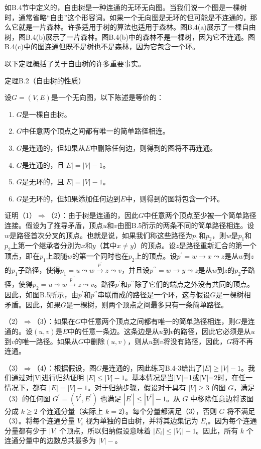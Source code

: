 \documentclass[lang=cn,newtx,10pt,scheme=chinese]{elegantbook}
\begin{document}
如B.4节中定义的，自由树是一种连通的无环无向图。当我们说一个图是一棵树时，通常省略“自由”这个形容词。如果一个无向图是无环的但可能是不连通的，那么它就是一片森林。许多适用于树的算法也适用于森林。图B.4(a)展示了一棵自由树，图B.4(b)展示了一片森林。图B.4(b)中的森林不是一棵树，因为它不连通。图B.4(c)中的图连通但既不是树也不是森林，因为它包含一个环。

以下定理概括了关于自由树的许多重要事实。

定理B.2（自由树的性质）

设$G=(V,E)$是一个无向图，以下陈述是等价的：

\begin{enumerate}
\item $G$是一棵自由树。
\item $G$中任意两个顶点之间都有唯一的简单路径相连。
\item $G$是连通的，但如果从$E$中删除任何边，则得到的图将不再连通。
\item $G$是连通的，且$|E|=|V|-1$。
\item $G$是无环的，且$|E|=|V|-1$。
\item $G$是无环的，但如果添加任何边到$E$中，则得到的图将包含一个环。
\end{enumerate}

证明（1）$\Rightarrow$（2）：由于树是连通的，因此$G$中任意两个顶点至少被一个简单路径连接。假设为了推导矛盾，顶点$u$和$v$由图B.5所示的两条不同的简单路径相连。设$w$是路径首次分叉的顶点。也就是说，如果我们称这些路径为$p_1$和$p_2$，则$w$是$p_1$和$p_2$上第一个继承者分别为$x$和$y$（其中$x \neq y$）的顶点。设$z$是路径重新汇合的第一个顶点，即在$p_1$上跟随$w$的第一个同时也在$p_2$上的顶点。设$p^{\prime}=w \rightarrow x \leadsto z$是从$w$到$z$的$p_1$子路径，使得$p_1=u \leadsto w \stackrel{p^{\prime}}{\rightarrow} z \leadsto v$，并且设$p^{\prime \prime}=w \rightarrow y \leadsto z$是从$w$到$z$的$p_2$子路径，使得$p_2=u \leadsto w \stackrel{p^{\prime \prime}}{\rightarrow} z \leadsto v$。路径$p^{\prime}$和$p^{\prime \prime}$除了它们的端点之外没有共同的顶点。因此，如图B.5所示，由$p^{\prime}$和$p^{\prime \prime}$串联而成的路径是一个环，这与假设$G$是一棵树相矛盾。因此，如果$G$是一棵树，则两个顶点之间最多只有一条简单路径。

（2）$\Rightarrow$（3）：如果在$G$中任意两个顶点之间都有唯一的简单路径相连，则$G$是连通的。设$(u,v)$是$E$中的任意一条边。这条边是从$u$到$v$的路径，因此它必须是从$u$到$v$的唯一路径。如果从$G$中删除$(u,v)$，则从$u$到$v$将没有路径，因此，$G$将不再连通。

（3）$\Rightarrow$（4）：根据假设，图$G$是连通的，因此练习B.4-3给出了$|E| \geq|V|-1$。我们通过对|V|进行归纳证明 $|E| \leq|V|-1$。基本情况是当|V|=1或|V|=2时，在任一情况下，都有 $|E|=|V|-1$。对于归纳步骤，假设对于具有 $|V| \geq 3 $ 的图 $G $，满足（3）的任何图 $G^{\prime}=(V^{\prime}, E^{\prime})$ 也满足 $|E^{\prime}| \leq|V^{\prime}|-1 $。从 $G $ 中移除任意边将该图分成 $k \geq 2 $ 个连通分量（实际上 $k=2 $）。每个分量都满足（3），否则 $G $ 将不满足（3）。将每个连通分量 $V_i $ 视为单独的自由树，并将其边集记为 $E_i $。因为每个连通分量都有少于 $|V|$ 个顶点，所以归纳假设意味着 $|E_i| \leq|V_i|-1 $。因此，所有 $k $ 个连通分量中的边数总共最多为 $|V|-$。
\end{document}
